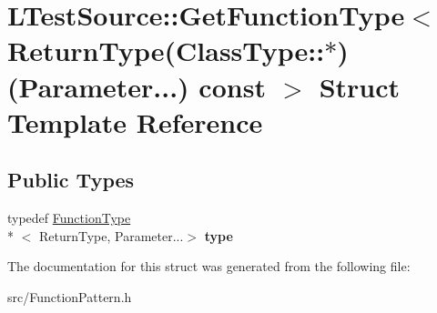 \hypertarget{struct_l_test_source_1_1_get_function_type_3_01_return_type_07_class_type_1_1_5_08_07_parameter_8_8_8_08_01const_01_01_4}{\section{L\-Test\-Source\-:\-:Get\-Function\-Type$<$ Return\-Type(Class\-Type\-:\-:$\ast$)(Parameter...) const $>$ Struct Template Reference}
\label{struct_l_test_source_1_1_get_function_type_3_01_return_type_07_class_type_1_1_5_08_07_parameter_8_8_8_08_01const_01_01_4}
}
\subsection*{Public Types}
\begin{DoxyCompactItemize}
\item 
\hypertarget{struct_l_test_source_1_1_get_function_type_3_01_return_type_07_class_type_1_1_5_08_07_parameter_8_8_8_08_01const_01_01_4_ac3699b93cbe17803fdce082a8e6a93aa}{typedef \hyperlink{struct_l_test_source_1_1_function_type}{Function\-Type}\\*
$<$ Return\-Type, Parameter...$>$ {\bfseries type}}\label{struct_l_test_source_1_1_get_function_type_3_01_return_type_07_class_type_1_1_5_08_07_parameter_8_8_8_08_01const_01_01_4_ac3699b93cbe17803fdce082a8e6a93aa}

\end{DoxyCompactItemize}


The documentation for this struct was generated from the following file\-:\begin{DoxyCompactItemize}
\item 
src/Function\-Pattern.\-h\end{DoxyCompactItemize}
